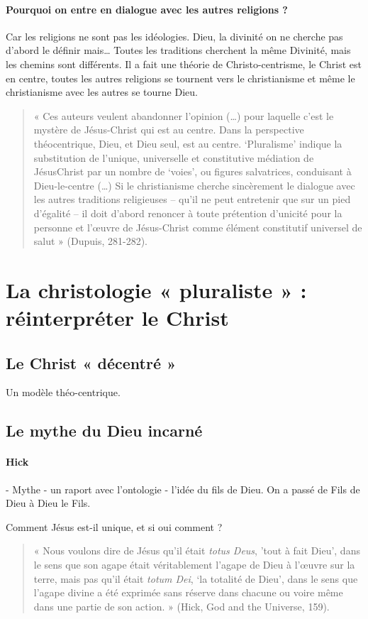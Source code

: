 	\paragraph{Pourquoi on entre en dialogue avec les autres religions ?} Car les religions ne sont pas les idéologies. Dieu, la	 divinité on ne cherche pas d'abord le définir mais… Toutes les traditions cherchent la même Divinité, mais les chemins sont différents. Il a fait une théorie de Christo-centrisme, le Christ est en centre, toutes les autres religions se tournent vers le christianisme et même le christianisme avec les autres se tourne Dieu.
	\begin{quote}
	    « Ces auteurs veulent abandonner l’opinion (…) pour laquelle c’est le mystère de Jésus-Christ qui est au centre. Dans la perspective théocentrique, Dieu, et Dieu seul, est au centre. ‘Pluralisme’ indique la substitution de l’unique, universelle et constitutive médiation de JésusChrist par un nombre de ‘voies’, ou figures salvatrices, conduisant à Dieu-le-centre  (…) Si le christianisme cherche sincèrement le dialogue avec les autres traditions religieuses – qu’il ne peut entretenir que sur un pied d’égalité – il doit d’abord renoncer à toute prétention d’unicité pour la personne et l’œuvre de Jésus-Christ comme élément constitutif universel de salut » (Dupuis, 281-282). 
	\end{quote}
	
\section{La christologie « pluraliste » : réinterpréter le Christ} 

\subsection{ Le Christ « décentré »} 


	Un modèle théo-centrique. 
 



\subsection{ Le mythe du Dieu incarné}
	\paragraph{Hick}- Mythe - un raport avec l’ontologie - l’idée du fils de Dieu. On a passé de Fils de Dieu à Dieu le Fils. 
	
	
	Comment Jésus est-il unique, et si oui comment ? 
	\begin{quote}
	    « Nous voulons dire de Jésus qu’il était \textit{totus Deus}, 'tout à fait Dieu', dans le sens que son agape était véritablement l’agape de Dieu à l’œuvre sur la terre, mais pas qu’il était \textit{totum Dei}, ‘la totalité de Dieu’, dans le sens que l’agape divine a été exprimée sans réserve dans chacune ou voire même dans une partie de son action. » (Hick, God and the Universe, 159). 
	\end{quote}
	
